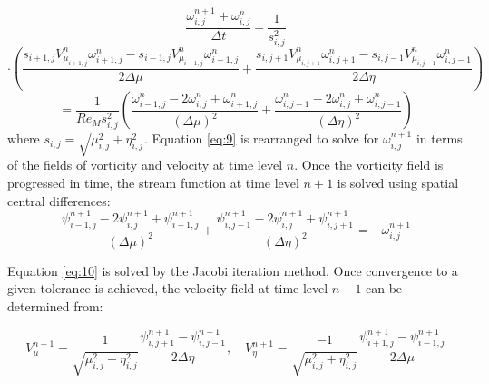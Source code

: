 \documentclass{article}
\begin{document}
\[
\frac{\omega^{n+1}_{i,j}+\omega^n_{i,j}}{\Delta t} + \frac{1}{s^2_{i,j}}
\]
\[
\cdot \left(
\frac{s_{i+1,j}V^n_{\mu_{i+1,j}}\omega^n_{i+1,j}-s_{i-1,j}V^n_{\mu_{i-1,j}}\omega^n_{i-1,j}}
     {2\Delta\mu}
+
\frac{s_{i,j+1}V^n_{\mu_{i,j+1}}\omega^n_{i,j+1}-s_{i,j-1}V^n_{\mu_{i,j-1}}\omega^n_{i,j-1}}
     {2\Delta\eta}
\right)
\]
\begin{equation}
\label{eq:9}
=\frac{1}{Re_M s^2_{i,j}}
\left(
\frac{\omega^n_{i-1,j}-2\omega^n_{i,j}+\omega^n_{i+1,j}}{(\Delta\mu)^2}
+
\frac{\omega^n_{i,j-1}-2\omega^n_{i,j}+\omega^n_{i,j-1}}{(\Delta\eta)^2}
\right)
\end{equation}
where $s_{i,j}=\sqrt{\mu^2_{i,j}+\eta^2_{i,j}}$.
Equation \ref{eq:9} is rearranged to solve for $\omega^{n+1}_{i,j}$ in terms of the fields of
vorticity and velocity at time level $n$.
Once the vorticity field is progressed in time, the stream
function at time level $n+1$ is solved using spatial central differences:
\begin{equation}
\label{eq:10}
\frac{\psi^{n+1}_{i-1,j}-2\psi^{n+1}_{i,j}+\psi^{n+1}_{i+1,j}}{(\Delta\mu)^2}+
\frac{\psi^{n+1}_{i,j-1}-2\psi^{n+1}_{i,j}+\psi^{n+1}_{i,j+1}}{(\Delta\eta)^2}
=-\omega^{n+1}_{i,j}
\end{equation}

Equation \ref{eq:10} is solved by the Jacobi iteration method. Once convergence to a given tolerance is achieved, the velocity field at time level $n+1$ can be determined from:

\begin{equation}
\label{eq:11}
V_\mu^{n+1}=\frac{1}{\sqrt{\mu_{i,j}^2+\eta_{i,j}^2}} \frac{\psi_{i,j+1}^{n+1} - \psi_{i,j-1}^{n+1}}{2\Delta \eta}, \quad V_\eta^{n+1}=\frac{-1}{\sqrt{\mu_{i,j}^2+\eta_{i,j}^2}} \frac{\psi_{i+1,j}^{n+1} - \psi_{i-1,j}^{n+1}}{2\Delta \mu}
\end{equation}
\end{document}
